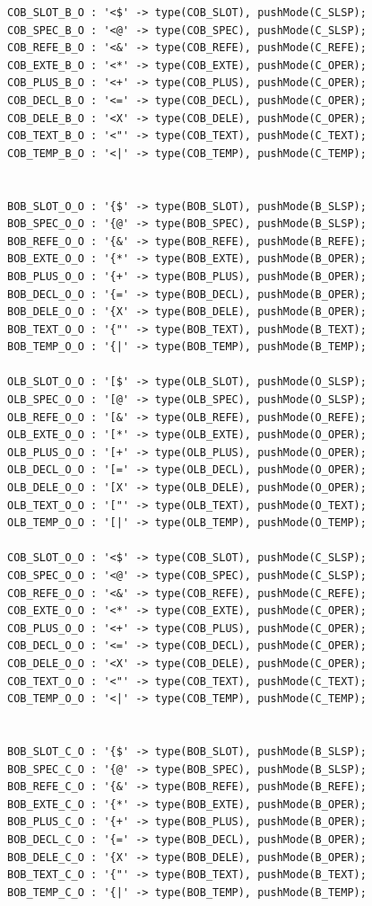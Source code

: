 \begin{verbatim}
COB_SLOT_B_O : '<$' -> type(COB_SLOT), pushMode(C_SLSP);
COB_SPEC_B_O : '<@' -> type(COB_SPEC), pushMode(C_SLSP);
COB_REFE_B_O : '<&' -> type(COB_REFE), pushMode(C_REFE);
COB_EXTE_B_O : '<*' -> type(COB_EXTE), pushMode(C_OPER);
COB_PLUS_B_O : '<+' -> type(COB_PLUS), pushMode(C_OPER);
COB_DECL_B_O : '<=' -> type(COB_DECL), pushMode(C_OPER);
COB_DELE_B_O : '<X' -> type(COB_DELE), pushMode(C_OPER);
COB_TEXT_B_O : '<"' -> type(COB_TEXT), pushMode(C_TEXT);
COB_TEMP_B_O : '<|' -> type(COB_TEMP), pushMode(C_TEMP);


BOB_SLOT_O_O : '{$' -> type(BOB_SLOT), pushMode(B_SLSP);
BOB_SPEC_O_O : '{@' -> type(BOB_SPEC), pushMode(B_SLSP);
BOB_REFE_O_O : '{&' -> type(BOB_REFE), pushMode(B_REFE);
BOB_EXTE_O_O : '{*' -> type(BOB_EXTE), pushMode(B_OPER);
BOB_PLUS_O_O : '{+' -> type(BOB_PLUS), pushMode(B_OPER);
BOB_DECL_O_O : '{=' -> type(BOB_DECL), pushMode(B_OPER);
BOB_DELE_O_O : '{X' -> type(BOB_DELE), pushMode(B_OPER);
BOB_TEXT_O_O : '{"' -> type(BOB_TEXT), pushMode(B_TEXT);
BOB_TEMP_O_O : '{|' -> type(BOB_TEMP), pushMode(B_TEMP);

OLB_SLOT_O_O : '[$' -> type(OLB_SLOT), pushMode(O_SLSP);
OLB_SPEC_O_O : '[@' -> type(OLB_SPEC), pushMode(O_SLSP);
OLB_REFE_O_O : '[&' -> type(OLB_REFE), pushMode(O_REFE);
OLB_EXTE_O_O : '[*' -> type(OLB_EXTE), pushMode(O_OPER);
OLB_PLUS_O_O : '[+' -> type(OLB_PLUS), pushMode(O_OPER);
OLB_DECL_O_O : '[=' -> type(OLB_DECL), pushMode(O_OPER);
OLB_DELE_O_O : '[X' -> type(OLB_DELE), pushMode(O_OPER);
OLB_TEXT_O_O : '["' -> type(OLB_TEXT), pushMode(O_TEXT);
OLB_TEMP_O_O : '[|' -> type(OLB_TEMP), pushMode(O_TEMP);

COB_SLOT_O_O : '<$' -> type(COB_SLOT), pushMode(C_SLSP);
COB_SPEC_O_O : '<@' -> type(COB_SPEC), pushMode(C_SLSP);
COB_REFE_O_O : '<&' -> type(COB_REFE), pushMode(C_REFE);
COB_EXTE_O_O : '<*' -> type(COB_EXTE), pushMode(C_OPER);
COB_PLUS_O_O : '<+' -> type(COB_PLUS), pushMode(C_OPER);
COB_DECL_O_O : '<=' -> type(COB_DECL), pushMode(C_OPER);
COB_DELE_O_O : '<X' -> type(COB_DELE), pushMode(C_OPER);
COB_TEXT_O_O : '<"' -> type(COB_TEXT), pushMode(C_TEXT);
COB_TEMP_O_O : '<|' -> type(COB_TEMP), pushMode(C_TEMP);


BOB_SLOT_C_O : '{$' -> type(BOB_SLOT), pushMode(B_SLSP);
BOB_SPEC_C_O : '{@' -> type(BOB_SPEC), pushMode(B_SLSP);
BOB_REFE_C_O : '{&' -> type(BOB_REFE), pushMode(B_REFE);
BOB_EXTE_C_O : '{*' -> type(BOB_EXTE), pushMode(B_OPER);
BOB_PLUS_C_O : '{+' -> type(BOB_PLUS), pushMode(B_OPER);
BOB_DECL_C_O : '{=' -> type(BOB_DECL), pushMode(B_OPER);
BOB_DELE_C_O : '{X' -> type(BOB_DELE), pushMode(B_OPER);
BOB_TEXT_C_O : '{"' -> type(BOB_TEXT), pushMode(B_TEXT);
BOB_TEMP_C_O : '{|' -> type(BOB_TEMP), pushMode(B_TEMP);


\end{verbatim}
